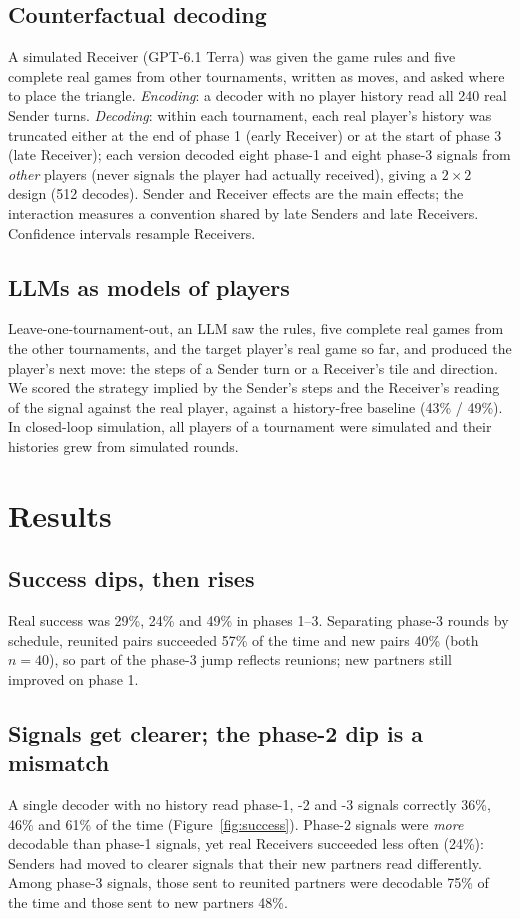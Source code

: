\documentclass[11pt]{article}
\begin{document}
\subsection{Counterfactual decoding}
A simulated Receiver (GPT-6.1 Terra) was given the game rules and five complete real games from other tournaments, written as moves, and asked where to place the triangle. \emph{Encoding}: a decoder with no player history read all 240 real Sender turns. \emph{Decoding}: within each tournament, each real player's history was truncated either at the end of phase 1 (early Receiver) or at the start of phase 3 (late Receiver); each version decoded eight phase-1 and eight phase-3 signals from \emph{other} players (never signals the player had actually received), giving a $2\times2$ design (512 decodes). Sender and Receiver effects are the main effects; the interaction measures a convention shared by late Senders and late Receivers. Confidence intervals resample Receivers.

\subsection{LLMs as models of players}
Leave-one-tournament-out, an LLM saw the rules, five complete real games from the other tournaments, and the target player's real game so far, and produced the player's next move: the steps of a Sender turn or a Receiver's tile and direction. We scored the strategy implied by the Sender's steps and the Receiver's reading of the signal against the real player, against a history-free baseline (43\% / 49\%). In closed-loop simulation, all players of a tournament were simulated and their histories grew from simulated rounds.

\section{Results}
\subsection{Success dips, then rises}
Real success was 29\%, 24\% and 49\% in phases 1--3. Separating phase-3 rounds by schedule, reunited pairs succeeded 57\% of the time and new pairs 40\% (both $n=40$), so part of the phase-3 jump reflects reunions; new partners still improved on phase 1.

\subsection{Signals get clearer; the phase-2 dip is a mismatch}
A single decoder with no history read phase-1, -2 and -3 signals correctly 36\%, 46\% and 61\% of the time (Figure~\ref{fig:success}). Phase-2 signals were \emph{more} decodable than phase-1 signals, yet real Receivers succeeded less often (24\%): Senders had moved to clearer signals that their new partners read differently. Among phase-3 signals, those sent to reunited partners were decodable 75\% of the time and those sent to new partners 48\%.
\end{document}
